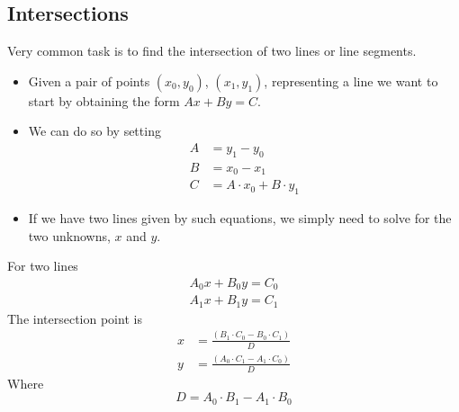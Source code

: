 \documentclass[12pt,t]{beamer}
\newcommand{\bi}{\begin{itemize}}
\newcommand{\ei}{\end{itemize}}
\begin{document}
\subsection{Intersections}
\begin{frame}
  Very common task is to find the intersection of two lines or line segments.
  \bi
    \item Given a pair of points $(x_0, y_0)$, $(x_1, y_1)$, representing a
      line we want to start by obtaining the form $Ax + By = C$.
    \item We can do so by setting
      \begin{align*}
        A &= y_1 - y_0 \\
        B &= x_0 - x_1 \\
        C &= A\cdot x_0 + B\cdot y_1
      \end{align*}
    \vspace{-10pt}
    \item If we have two lines given by such equations, we simply need to solve
      for the two unknowns, $x$ and $y$.
  \ei
\end{frame}

\begin{frame}
  For two lines
  \begin{align*}
    A_0 x + B_0 y = C_0  \\
    A_1 x + B_1 y = C_1
  \end{align*}
  The intersection point is
  \begin{align*}
      x &= \frac{(B_1 \cdot C_0 - B_0 \cdot C_1)}{D} \\
      y &= \frac{(A_0 \cdot C_1 - A_1 \cdot C_0)}{D}
  \end{align*}
  Where
  \[
    D = A_0 \cdot B_1 - A_1 \cdot B_0
  \]
\end{frame}
\end{document}

